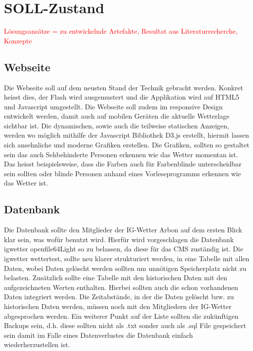 \documentclass[a4paper,ngerman, 11pt, pagesize]{report}
\newcommand\Diskussionspunkt[1]{\textcolor{red}{#1}}
\begin{document}
\section{SOLL-Zustand}
\Diskussionspunkt{Lösungsansätze = zu entwickelnde Artefakte, 
Resultat aus Literaturrecherche, 
Konzepte}

\subsection{Webseite}
Die Webseite soll auf dem neusten Stand der Technik gebracht werden. Konkret heisst dies, der Flash wird ausgemustert und die Applikation wird auf HTML5 und Javascript umgestellt. Die Webseite soll zudem im responsive Design entwickelt werden, damit auch auf mobilen Geräten die aktuelle Wetterlage sichtbar ist. Die dynamischen, sowie auch die teilweise statischen Anzeigen, werden wo möglich mithilfe der Javascript Bibliothek D3.js erstellt, hiermit lassen sich ansehnliche und moderne Grafiken erstellen. Die Grafiken, sollten so gestaltet sein das auch Sehbehinderte Personen erkennen wie das Wetter momentan ist. Das heisst beispielsweise, dass die Farben auch für Farbenblinde unterscheidbar sein sollten oder blinde Personen anhand eines Vorleseprogramms erkennen wie das Wetter ist. 

\subsection{Datenbank}
Die Datenbank sollte den Mitglieder der IG-Wetter Arbon auf dem ersten Blick klar sein, was wofür benutzt wird. Hierfür wird vorgeschlagen die Datenbank igwetter openfile64Light so zu belassen, da diese für das CMS zuständig ist. Die igwetter wettertest, sollte neu klarer strukturiert werden, in eine Tabelle mit allen Daten, wobei Daten gelöscht werden sollten um unnötigen Speicherplatz nicht zu belasten. Zusätzlich sollte eine Tabelle mit den historischen Daten mit den aufgezeichneten Werten enthalten. Hierbei sollten auch die schon vorhandenen Daten integriert werden. Die Zeitabstände, in der die Daten gelöscht bzw. zu historischen Daten werden, müssen noch mit den Mitgliedern der IG-Wetter abgesprochen werden. Ein weiterer Punkt auf der Liste sollten die zukünftigen Backups sein, d.h. diese sollten nicht als .txt sonder auch als .sql File gespeichert sein damit im Falle eines Datenverlustes die Datenbank einfach wiederherzustellen ist.


   
\end{document}
